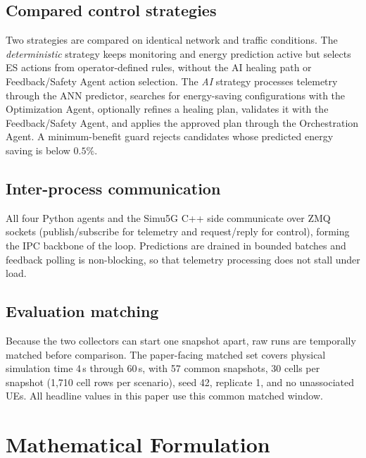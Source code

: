\documentclass[conference]{IEEEtran}
\begin{document}
\subsection{Compared control strategies}
Two strategies are compared on identical network and traffic conditions. The \emph{deterministic} strategy keeps monitoring and energy prediction active but selects ES actions from operator-defined rules, without the AI healing path or Feedback/Safety Agent action selection. The \emph{AI} strategy processes telemetry through the ANN predictor, searches for energy-saving configurations with the Optimization Agent, optionally refines a healing plan, validates it with the Feedback/Safety Agent, and applies the approved plan through the Orchestration Agent. A minimum-benefit guard rejects candidates whose predicted energy saving is below $0.5\%$.

\subsection{Inter-process communication}
All four Python agents and the Simu5G C++ side communicate over ZMQ sockets (publish/subscribe for telemetry and request/reply for control), forming the IPC backbone of the loop. Predictions are drained in bounded batches and feedback polling is non-blocking, so that telemetry processing does not stall under load.

\subsection{Evaluation matching}
Because the two collectors can start one snapshot apart, raw runs are temporally matched before comparison. The paper-facing matched set covers physical simulation time 4\,s through 60\,s, with 57 common snapshots, 30 cells per snapshot (1{,}710 cell rows per scenario), seed 42, replicate 1, and no unassociated UEs. All headline values in this paper use this common matched window.

\section{Mathematical Formulation}\label{sec:math}
\end{document}
